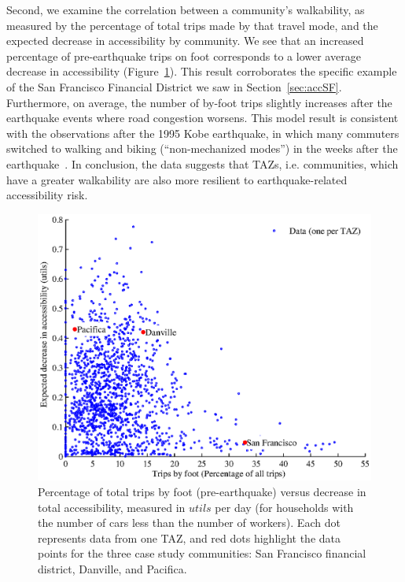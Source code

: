 
Second, we examine the correlation between a community's walkability, as measured by the percentage of total trips made by that travel mode, and the expected decrease in accessibility by community. We see that an increased percentage of pre-earthquake trips on foot corresponds to a lower average decrease in accessibility (Figure~\ref{fig:walkingVsAcc}). This result corroborates the specific example of the San Francisco Financial District we saw in Section~\ref{sec:accSF}. Furthermore,  on average, the number of by-foot trips slightly increases after the earthquake events where road congestion worsens. This model result is consistent with the observations after the 1995 Kobe earthquake, in which many commuters switched to walking and biking (``non-mechanized modes'') in the weeks after the earthquake~\cite{gordon_transport-related_1998}. In conclusion, the data suggests that TAZs, i.e. communities, which have a greater walkability are also more resilient to earthquake-related accessibility risk. 

\begin{figure}[H]
\centering
\includegraphics[width=5in]{FIGS/equity_footVsAccv3.eps} 
\caption{Percentage of total trips by foot (pre-earthquake) versus decrease in total accessibility, measured in $utils$ per day (for households with the number of cars less than the number of workers). Each dot represents data from one TAZ, and red dots highlight the data points for the three case study communities: San Francisco financial district, Danville, and Pacifica.}
\label{fig:walkingVsAcc}
\end{figure}


